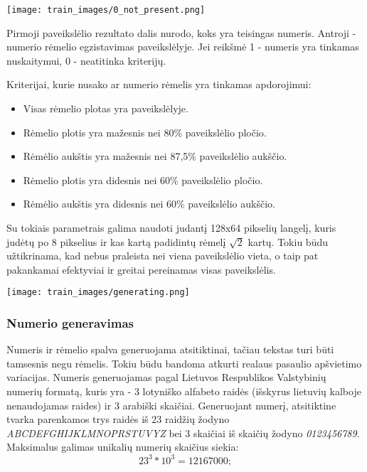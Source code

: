\documentclass{VUMIFPSkursinis}
\begin{document}
\begin{minipage}{\linewidth}
  \centering
  \texttt{[image: train\_images/0\_not\_present.png]}
\end{minipage}

Pirmoji paveikslėlio rezultato dalis nurodo, koks yra teisingas numeris. Antroji - numerio rėmelio egzistavimas paveikslėlyje.
Jei reikšmė 1 - numeris yra tinkamas nuskaitymui, 0 - neatitinka kriterijų. 

Kriterijai, kurie nusako ar numerio rėmelis yra tinkamas apdorojimui:

\begin{itemize}
  \item Visas rėmelio plotas yra paveikslėlyje.
  \item Rėmelio plotis yra mažesnis nei 80\% paveikslėlio pločio.
  \item Rėmėlio aukštis yra mažesnis nei 87,5\% paveikslėlio aukščio.
  \item Rėmelio plotis yra didesnis nei 60\% paveikslėlio pločio.
  \item Rėmėlio aukštis yra didesnis nei 60\% paveikslėlio aukščio.
\end{itemize}

Su tokiais parametrais galima naudoti judantį 128x64 pikselių langelį, kuris judėtų po 8 pikselius ir kas kartą padidintų rėmelį
\begin{math}
  \sqrt{2}
\end{math}
kartų. Tokiu būdu užtikrinama, kad nebus praleista nei viena paveikslėlio vieta, o taip pat pakankamai efektyviai ir greitai pereinamas
visas paveikslėlis.

\begin{minipage}{\linewidth}
  \centering
  \texttt{[image: train\_images/generating.png]}
\end{minipage}

\subsubsection{Numerio generavimas}
Numeris ir rėmelio spalva generuojama atsitiktinai, tačiau tekstas turi būti tamsesnis negu rėmelis. Tokiu būdu bandoma atkurti realaus pasaulio apšvietimo variacijas.
Numeris generuojamas pagal Lietuvos Respublikos Valstybinių numerių formatą, kuris yra - 3 lotyniško alfabeto
raidės (išskyrus lietuvių kalboje nenaudojamas raides) ir 3 arabiški skaičiai. Generuojant numerį, 
atsitiktine tvarka parenkamos trys raidės iš 23 raidžių žodyno \textit{ABCDEFGHIJKLMNOPRSTUVYZ} bei 3 skaičiai 
iš skaičių žodyno \textit{0123456789}. Maksimalus galimas unikalių numerių skaičius siekia:
\begin{equation}
  23^3 * 10^3 = 12167000;
\end{equation}
\end{document}
